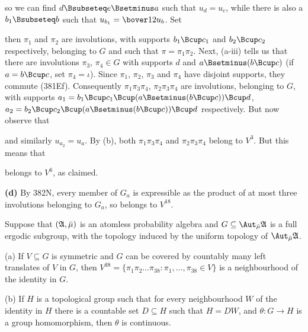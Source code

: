 {

\noindent so we can find $d\Bsubseteq e\Bsetminus a$ such that
$u_d=u_c$, while there is also a $b_1\Bsubseteq b$ such that
$u_{b_1}=\bover12u_b$.   Set


\noindent then $\pi_1$ and $\pi_2$ are involutions, with supports
$b_1\Bcup c_1$ and $b_2\Bcup c_2$ respectively, belonging to $G$
and such that $\pi=\pi_1\pi_2$.
Next, (a-iii) tells us that there are involutions $\pi_3$, $\pi_4\in G$
with supports $d$ and $a\Bsetminus(b\Bcup c)$ (if $a=b\Bcup c$, set
$\pi_4=\iota$).
Since $\pi_1$, $\pi_2$, $\pi_3$ and $\pi_4$ have disjoint supports,
they commute (381Ef).   Consequently
$\pi_1\pi_3\pi_4$, $\pi_2\pi_3\pi_4$ are involutions, belonging to $G$,
with supports
$a_1=b_1\Bcup c_1\Bcup(a\Bsetminus(b\Bcup c))\Bcup d$,
$a_2=b_2\Bcup c_2\Bcup(a\Bsetminus(b\Bcup c))\Bcup d$ respectively.
But now observe that


\noindent and similarly $u_{a_2}=u_a$.   By (b), both
$\pi_1\pi_3\pi_4$ and $\pi_2\pi_3\pi_4$ belong to $V^3$.
But this means that


\noindent belongs to $V^6$, as claimed.\ \Qed

\medskip

{\bf (d)} By 382N, every member of $G_a$ is
expressible as the product of at most three involutions belonging to
$G_a$, so belongs to $V^{18}$.
}%

Suppose that $(\frak A,\bar\mu)$ is an atomless probability algebra and
$G\subseteq\AmuA$ is a full ergodic subgroup, with the topology induced by the uniform topology of $\AmuA$.

(a) If $V\subseteq G$ is symmetric
and $G$ can be covered by countably many left translates of $V$ in $G$,
then $V^{38}=\{\pi_1\pi_2\ldots\pi_{38}:\pi_1,\ldots,\pi_{38}\in V\}$
is a neighbourhood of the identity in $G$.

(b) If $H$ is a topological group such that for every neighbourhood
$W$ of the identity in $H$ there is a countable set $D\subseteq H$ such
that $H=DW$,
and $\theta:G\to H$ is a group homomorphism, then $\theta$ is continuous.

